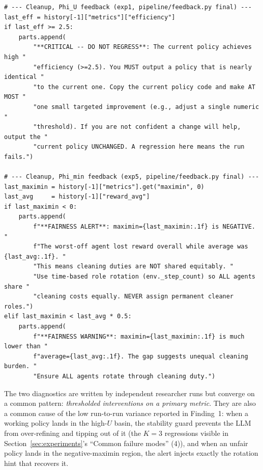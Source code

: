 \documentclass{article}
\begin{document}
\begin{lstlisting}[style=pythonpolicy, caption={Adaptive feedback diagnostics. \emph{Top}: efficiency-optimized run (exp1) -- a stability guard prevents iter-3 regression once $U$ is high. \emph{Bottom}: maximin-optimized run (exp5) -- two fairness diagnostics that fire when the worst-off agent loses reward.}, label={lst:feedback-adapt}]
# --- Cleanup, Phi_U feedback (exp1, pipeline/feedback.py final) ---
last_eff = history[-1]["metrics"]["efficiency"]
if last_eff >= 2.5:
    parts.append(
        "**CRITICAL -- DO NOT REGRESS**: The current policy achieves high "
        "efficiency (>=2.5). You MUST output a policy that is nearly identical "
        "to the current one. Copy the current policy code and make AT MOST "
        "one small targeted improvement (e.g., adjust a single numeric "
        "threshold). If you are not confident a change will help, output the "
        "current policy UNCHANGED. A regression here means the run fails.")

# --- Cleanup, Phi_min feedback (exp5, pipeline/feedback.py final) ---
last_maximin = history[-1]["metrics"].get("maximin", 0)
last_avg     = history[-1]["reward_avg"]
if last_maximin < 0:
    parts.append(
        f"**FAIRNESS ALERT**: maximin={last_maximin:.1f} is NEGATIVE. "
        f"The worst-off agent lost reward overall while average was {last_avg:.1f}. "
        "This means cleaning duties are NOT shared equitably. "
        "Use time-based role rotation (env._step_count) so ALL agents share "
        "cleaning costs equally. NEVER assign permanent cleaner roles.")
elif last_maximin < last_avg * 0.5:
    parts.append(
        f"**FAIRNESS WARNING**: maximin={last_maximin:.1f} is much lower than "
        f"average={last_avg:.1f}. The gap suggests unequal cleaning burden. "
        "Ensure ALL agents rotate through cleaning duty.")
\end{lstlisting}

The two diagnostics are written by independent researcher runs but converge on a common pattern: \emph{thresholded interventions on a primary metric}. They are also a common cause of the low run-to-run variance reported in Finding~1: when a working policy lands in the high-$U$ basin, the stability guard prevents the LLM from over-refining and tipping out of it (the $K{=}3$ regressions visible in Section~\ref{sec:experiments}'s ``Common failure modes'' (4)), and when an unfair policy lands in the negative-maximin region, the alert injects exactly the rotation hint that recovers it.
\end{document}
